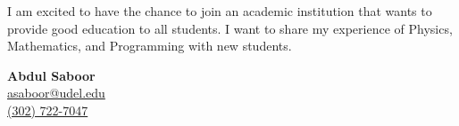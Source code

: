 \documentclass[letter,11pt]{article}
\begin{document}
\vspace{4mm}
I am excited to have the chance to join an academic institution that wants to provide good 
education to all students. I want to share my experience of Physics, Mathematics, 
and Programming with new students.

\vspace{5mm}
\noindent
\textbf{Abdul Saboor} \\
\href{mailto:asaboor@udel.edu}{asaboor@udel.edu} \\
\href{tel:+13027227047}{(302) 722-7047}
\end{document}
